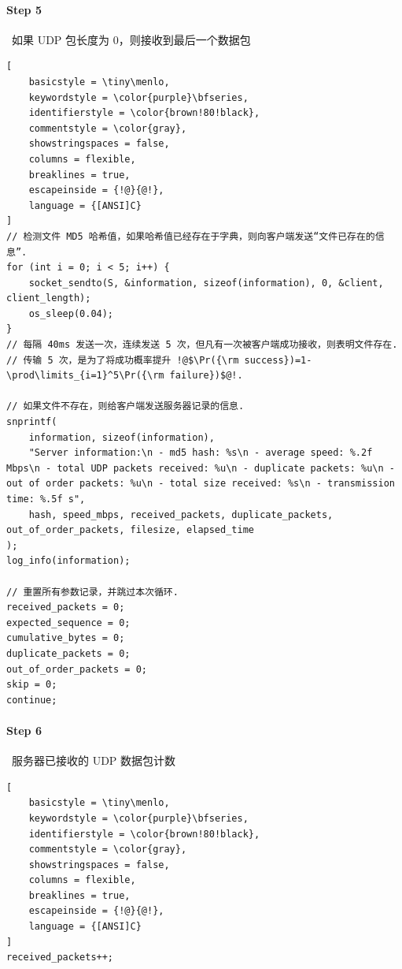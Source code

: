\documentclass{article}
\begin{document}
\paragraph*{Step 5}~{如果 UDP 包长度为 0，则接收到最后一个数据包}
\begin{lstlisting}[
    basicstyle = \tiny\menlo,
    keywordstyle = \color{purple}\bfseries,
    identifierstyle = \color{brown!80!black},
    commentstyle = \color{gray},
    showstringspaces = false,
    columns = flexible,
    breaklines = true,
    escapeinside = {!@}{@!},
    language = {[ANSI]C}
]
// 检测文件 MD5 哈希值，如果哈希值已经存在于字典，则向客户端发送“文件已存在的信息”.
for (int i = 0; i < 5; i++) {
    socket_sendto(S, &information, sizeof(information), 0, &client, client_length);
    os_sleep(0.04);
}
// 每隔 40ms 发送一次，连续发送 5 次，但凡有一次被客户端成功接收，则表明文件存在.
// 传输 5 次，是为了将成功概率提升 !@$\Pr({\rm success})=1-\prod\limits_{i=1}^5\Pr({\rm failure})$@!.

// 如果文件不存在，则给客户端发送服务器记录的信息.
snprintf(
    information, sizeof(information),
    "Server information:\n - md5 hash: %s\n - average speed: %.2f Mbps\n - total UDP packets received: %u\n - duplicate packets: %u\n - out of order packets: %u\n - total size received: %s\n - transmission time: %.5f s",
    hash, speed_mbps, received_packets, duplicate_packets, out_of_order_packets, filesize, elapsed_time
);
log_info(information);

// 重置所有参数记录，并跳过本次循环.
received_packets = 0;
expected_sequence = 0;
cumulative_bytes = 0;
duplicate_packets = 0;
out_of_order_packets = 0;
skip = 0;
continue;
\end{lstlisting}

\paragraph*{Step 6}~{服务器已接收的 UDP 数据包计数}
\begin{lstlisting}[
    basicstyle = \tiny\menlo,
    keywordstyle = \color{purple}\bfseries,
    identifierstyle = \color{brown!80!black},
    commentstyle = \color{gray},
    showstringspaces = false,
    columns = flexible,
    breaklines = true,
    escapeinside = {!@}{@!},
    language = {[ANSI]C}
]
received_packets++;
\end{lstlisting}
\end{document}
